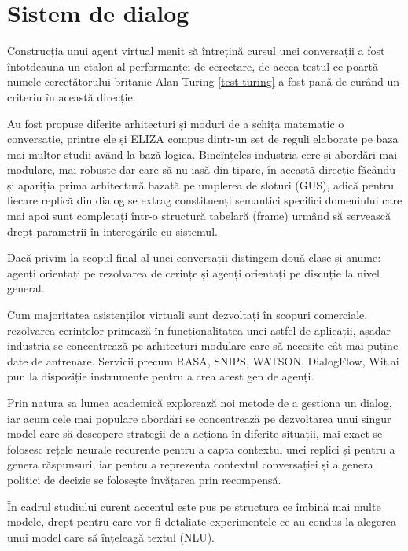 \chapter{Sistem de dialog}


Construcția unui agent virtual menit să întrețină cursul unei conversații a fost întotdeauna un etalon al performanței de cercetare, de aceea testul ce poartă numele cercetătorului britanic Alan Turing \ref{test-turing} a fost pană de curând un criteriu în această direcție.

Au fost propuse diferite arhitecturi și moduri de a schița matematic o conversație, printre ele și ELIZA compus dintr-un set de reguli elaborate pe baza mai multor studii având la bază logica. Bineînțeles industria cere și abordări mai modulare, mai robuste dar care să nu iasă din tipare, în această direcție făcându-și apariția prima arhitectură bazată pe umplerea de sloturi (GUS), adică pentru fiecare replică din dialog se extrag constituenți semantici specifici domeniului care mai apoi sunt completați într-o structură tabelară (frame) urmând să servească drept parametrii în interogările cu sistemul.

Dacă privim la scopul final al unei conversații distingem două clase și anume: agenți orientați pe rezolvarea de cerințe și agenți orientați pe discuție la nivel general.

Cum majoritatea asistenților virtuali sunt dezvoltați în scopuri comerciale, rezolvarea cerințelor primează în funcționalitatea unei astfel de aplicații, așadar industria se concentrează pe arhitecturi modulare care să necesite cât mai puține date de antrenare. Servicii precum RASA, SNIPS, WATSON, DialogFlow, Wit.ai pun la dispoziție instrumente pentru a crea acest gen de agenți.

Prin natura sa lumea academică explorează noi metode de a gestiona un dialog, iar acum cele mai populare abordări se concentrează pe dezvoltarea unui singur model care să descopere strategii de a acționa în diferite situații, mai exact se folosesc rețele neurale recurente pentru a capta contextul unei replici și pentru a genera răspunsuri, iar pentru a reprezenta contextul conversației și a genera politici de decizie se folosește învățarea prin recompensă. \cite{rl-seq2seq}

În cadrul studiului curent accentul este pus pe structura ce îmbină mai multe modele, drept pentru care vor fi detaliate experimentele ce au condus la alegerea unui model care să înțeleagă textul (NLU).

